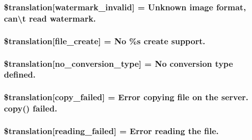 \subsubsection[{\$translation}]{\setlength{\rightskip}{0pt plus 5cm}\$translation\mbox{[}\textquotesingle{}watermark\+\_\+invalid\textquotesingle{}\mbox{]} = \textquotesingle{}Unknown image format, can\textbackslash{}\textquotesingle{}t read watermark.\textquotesingle{}}\label{class_8upload_8xx___x_x_8php_ac336e7a5701e47ba4a05e9e498a3cc44}
\hypertarget{class_8upload_8xx___x_x_8php_a1ecb4673e4fb69e06b3f20b65cecf30a}{}
\subsubsection[{\$translation}]{\setlength{\rightskip}{0pt plus 5cm}\$translation\mbox{[}\textquotesingle{}file\+\_\+create\textquotesingle{}\mbox{]} = \textquotesingle{}No \%s create support.\textquotesingle{}}\label{class_8upload_8xx___x_x_8php_a1ecb4673e4fb69e06b3f20b65cecf30a}
\hypertarget{class_8upload_8xx___x_x_8php_a4712d7ec28e9a7f17eb3338af2358363}{}
\subsubsection[{\$translation}]{\setlength{\rightskip}{0pt plus 5cm}\$translation\mbox{[}\textquotesingle{}no\+\_\+conversion\+\_\+type\textquotesingle{}\mbox{]} = \textquotesingle{}No conversion type defined.\textquotesingle{}}\label{class_8upload_8xx___x_x_8php_a4712d7ec28e9a7f17eb3338af2358363}
\hypertarget{class_8upload_8xx___x_x_8php_a783c9358bcf54a054545b50098bc679b}{}
\subsubsection[{\$translation}]{\setlength{\rightskip}{0pt plus 5cm}\$translation\mbox{[}\textquotesingle{}copy\+\_\+failed\textquotesingle{}\mbox{]} = \textquotesingle{}Error copying file on the server. copy() failed.\textquotesingle{}}\label{class_8upload_8xx___x_x_8php_a783c9358bcf54a054545b50098bc679b}
\hypertarget{class_8upload_8xx___x_x_8php_a01bea14c9fd5f353f62db44beabfcd42}{}
\subsubsection[{\$translation}]{\setlength{\rightskip}{0pt plus 5cm}\$translation\mbox{[}\textquotesingle{}reading\+\_\+failed\textquotesingle{}\mbox{]} = \textquotesingle{}Error reading the file.\textquotesingle{}}\label{class_8upload_8xx___x_x_8php_a01bea14c9fd5f353f62db44beabfcd42}
